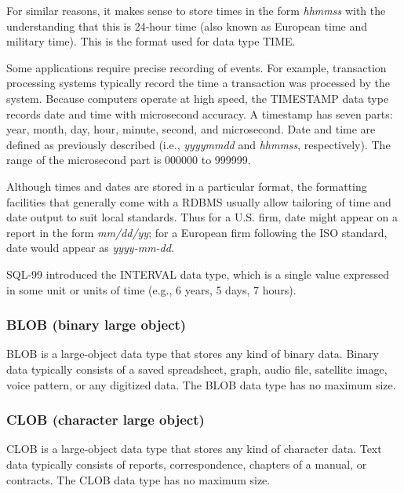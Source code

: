 \documentclass[
]{article}
\begin{document}
For similar reasons, it makes sense to store times in the form
\emph{hhmmss} with the understanding that this is 24-hour time (also
known as European time and military time). This is the format used for
data type TIME.

Some applications require precise recording of events. For example,
transaction processing systems typically record the time a transaction
was processed by the system. Because computers operate at high speed,
the TIMESTAMP data type records date and time with microsecond accuracy.
A timestamp has seven parts: year, month, day, hour, minute, second, and
microsecond. Date and time are defined as previously described (i.e.,
\emph{yyyymmdd} and \emph{hhmmss}, respectively). The range of the
microsecond part is 000000 to 999999.

Although times and dates are stored in a particular format, the
formatting facilities that generally come with a RDBMS usually allow
tailoring of time and date output to suit local standards. Thus for a
U.S. firm, date might appear on a report in the form \emph{mm/dd/yy};
for a European firm following the ISO standard, date would appear as
\emph{yyyy-mm-dd}.

SQL-99 introduced the INTERVAL data type, which is a single value
expressed in some unit or units of time (e.g., 6 years, 5 days, 7
hours).

\hypertarget{blob-binary-large-object}{%
\subsubsection*{BLOB (binary large
object)}\label{blob-binary-large-object}}

BLOB is a large-object data type that stores any kind of binary data.
Binary data typically consists of a saved spreadsheet, graph, audio
file, satellite image, voice pattern, or any digitized data. The BLOB
data type has no maximum size.

\hypertarget{clob-character-large-object}{%
\subsubsection*{CLOB (character large
object)}\label{clob-character-large-object}}

CLOB is a large-object data type that stores any kind of character data.
Text data typically consists of reports, correspondence, chapters of a
manual, or contracts. The CLOB data type has no maximum size.
\end{document}
